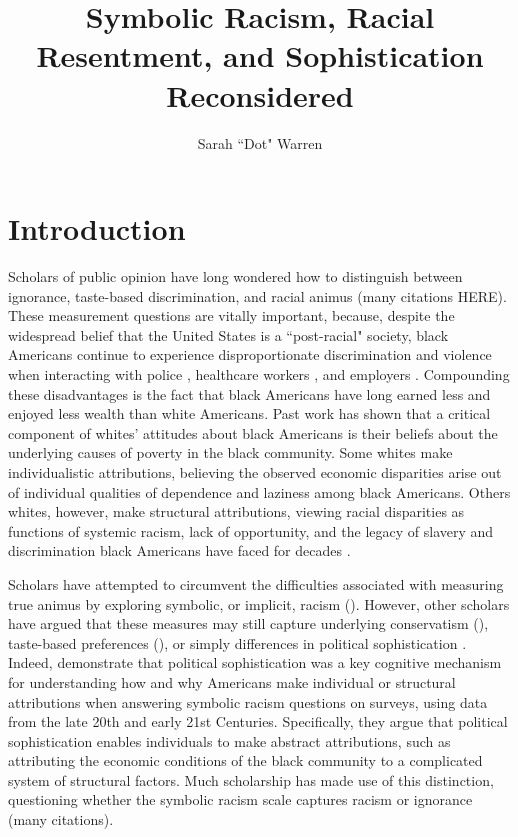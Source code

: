 \documentclass[12pt]{paper}
\title{Symbolic Racism, Racial Resentment, and Sophistication Reconsidered}
\author{Sarah ``Dot" Warren}
\date{}
\begin{document}
\maketitle

\doublespacing
\section*{Introduction}
Scholars of public opinion have long wondered how to distinguish between ignorance, taste-based discrimination, and racial animus (many citations HERE). These measurement questions are vitally important, because, despite the widespread belief that the United States is a ``post-racial" society, black Americans continue to experience disproportionate discrimination and violence when interacting with police \citep{knox_administrative_2020, zhao_note_2022}, healthcare workers \citep{flores_racial_2005, penner_reducing_2014}, and employers \citep{quillian_meta-analysis_2017, kang_whitened_2016}. Compounding these disadvantages is the fact that black Americans have long earned less and enjoyed less wealth \citep{shapiro_hidden_2004} than white Americans. Past work has shown that a critical component of whites' attitudes about black Americans is their beliefs about the underlying causes of poverty in the black community. Some whites make individualistic attributions, believing the observed economic disparities arise out of individual qualities of dependence and laziness among black Americans. Others whites, however, make structural attributions, viewing racial disparities as functions of systemic racism, lack of opportunity, and the legacy of slavery and discrimination black Americans have faced for decades \citep{feagin_poverty_1972}.

Scholars have attempted to circumvent the difficulties associated with measuring true animus by exploring symbolic, or implicit, racism (). However, other scholars have argued that these measures may still capture underlying conservatism (), taste-based preferences (), or simply differences in political sophistication \citep{gomez_rethinking_2006}. Indeed, \cite{gomez_rethinking_2006} demonstrate that political sophistication was a key cognitive mechanism for understanding how and why Americans make individual or structural attributions when answering symbolic racism questions on surveys, using data from the late 20th and early 21st Centuries. Specifically, they argue that political sophistication enables individuals to make abstract attributions, such as attributing the economic conditions of the black community to a complicated system of structural factors. Much scholarship has made use of this distinction, questioning whether the symbolic racism scale captures racism or ignorance (many citations).
\end{document}
